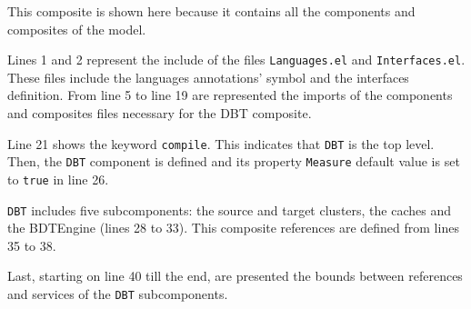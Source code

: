 \documentclass[11pt]{report}
\begin{document}
	\par This composite is shown here because it contains all the components and composites of the model.
	\par Lines 1 and 2 represent the include of the files \texttt{Languages.el} and \texttt{Interfaces.el}. These files include the languages annotations' symbol and the interfaces definition. From line 5 to line 19 are represented the imports of the components and composites files necessary for the DBT composite.
	\par Line 21 shows the keyword \texttt{compile}. This indicates that \texttt{DBT} is the top level. Then, the \texttt{DBT} component is defined and its property \texttt{Measure} default value is set to \texttt{true} in line 26.
	\par \texttt{DBT} includes five subcomponents: the source and target clusters, the caches and the BDTEngine (lines 28 to 33). This composite references are defined from lines 35 to 38.
	\par Last, starting on line 40 till the end, are presented the bounds between references and services of the \texttt{DBT} subcomponents.
\end{document}

